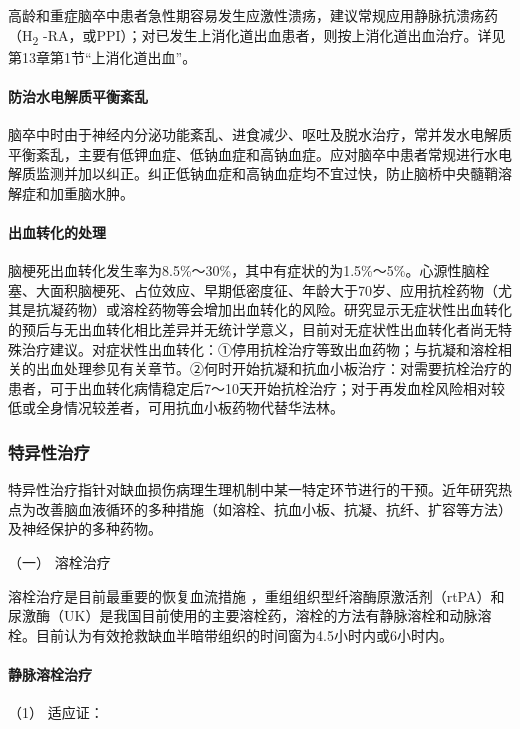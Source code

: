 高龄和重症脑卒中患者急性期容易发生应激性溃疡，建议常规应用静脉抗溃疡药（H\textsubscript{2}
-RA，或PPI）；对已发生上消化道出血患者，则按上消化道出血治疗。详见第13章第1节“上消化道出血”。

\paragraph{防治水电解质平衡紊乱}

脑卒中时由于神经内分泌功能紊乱、进食减少、呕吐及脱水治疗，常并发水电解质平衡紊乱，主要有低钾血症、低钠血症和高钠血症。应对脑卒中患者常规进行水电解质监测并加以纠正。纠正低钠血症和高钠血症均不宜过快，防止脑桥中央髓鞘溶解症和加重脑水肿。

\paragraph{出血转化的处理}

脑梗死出血转化发生率为8.5\%～30\%，其中有症状的为1.5\%～5\%。心源性脑栓塞、大面积脑梗死、占位效应、早期低密度征、年龄大于70岁、应用抗栓药物（尤其是抗凝药物）或溶栓药物等会增加出血转化的风险。研究显示无症状性出血转化的预后与无出血转化相比差异并无统计学意义，目前对无症状性出血转化者尚无特殊治疗建议。对症状性出血转化：①停用抗栓治疗等致出血药物；与抗凝和溶栓相关的出血处理参见有关章节。②何时开始抗凝和抗血小板治疗：对需要抗栓治疗的患者，可于出血转化病情稳定后7～10天开始抗栓治疗；对于再发血栓风险相对较低或全身情况较差者，可用抗血小板药物代替华法林。

\subsubsection{特异性治疗}

特异性治疗指针对缺血损伤病理生理机制中某一特定环节进行的干预。近年研究热点为改善脑血液循环的多种措施（如溶栓、抗血小板、抗凝、抗纤、扩容等方法）及神经保护的多种药物。

\hypertarget{text00242.htmlux5cux23CHP8-1-2-3-4-1}{}
（一） 溶栓治疗

溶栓治疗是目前最重要的恢复血流措施
，重组组织型纤溶酶原激活剂（rtPA）和尿激酶（UK）是我国目前使用的主要溶栓药，溶栓的方法有静脉溶栓和动脉溶栓。目前认为有效抢救缺血半暗带组织的时间窗为4.5小时内或6小时内。

\paragraph{静脉溶栓治疗}

\hypertarget{text00242.htmlux5cux23CHP8-1-2-3-4-1-1-1}{}
（1） 适应证：

